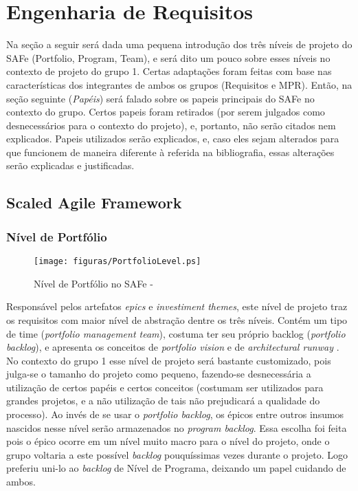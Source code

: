 \chapter[Engenharia de Requisitos]{Engenharia de Requisitos}
Na seção a seguir será dada uma pequena introdução dos três níveis de projeto do SAFe (Portfolio, Program, Team), e será dito um pouco sobre esses níveis no contexto de projeto do grupo 1. Certas adaptações foram feitas com base nas características dos integrantes de ambos os grupos (Requisitos e MPR). Então, na seção seguinte (\emph{Papéis}) será falado sobre os papeis principais do SAFe no contexto do grupo. Certos papeis foram retirados (por serem julgados como desnecessários para o contexto do projeto), e, portanto, não serão citados nem explicados. Papeis utilizados serão explicados, e, caso eles sejam alterados para que funcionem de maneira diferente à referida na bibliografia, essas alterações serão explicadas e justificadas.

\section{Scaled Agile Framework}
\subsection{Nível de Portfólio}
\begin{figure}[h]
  \centering
  \caption{Nível de Portfólio no SAFe - \cite[p. 44]{safe001}}
  \texttt{[image: figuras/PortfolioLevel.ps]}
\end{figure}

Responsável pelos artefatos \emph{epics} e \emph{investiment themes}, este nível de projeto traz os requisitos com maior nível de abstração dentre os três níveis. Contém um tipo de time (\emph{portfolio management team}), costuma ter seu próprio backlog (\emph{portfolio backlog}), e apresenta os conceitos de \emph{portfolio vision} e de \emph{architectural runway} \cite[p. 227-228]{safe001}. No contexto do grupo 1 esse nível de projeto será bastante customizado, pois julga-se o tamanho do projeto como pequeno, fazendo-se desnecessária a utilização de certos papéis e certos conceitos (costumam ser utilizados para grandes projetos, e a não utilização de tais não prejudicará a qualidade do processo). Ao invés de se usar o \emph{portfolio backlog}, os épicos entre outros insumos nascidos nesse nível serão armazenados no \emph{program backlog}. Essa escolha foi feita pois o épico ocorre em um nível muito macro para o nível do projeto, onde o grupo voltaria a este possível \emph{backlog} pouquíssimas vezes durante o projeto. Logo preferiu uni-lo ao \emph{backlog} de Nível de Programa, deixando um papel cuidando de ambos.

